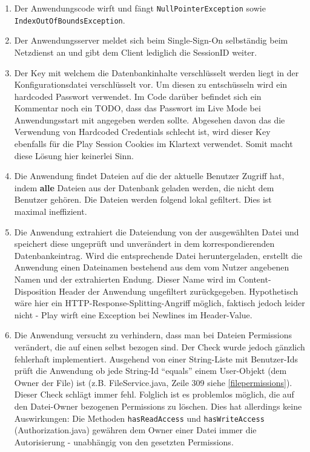 \documentclass[12pt,DIV14,BCOR10mm,a4paper,parskip=half-,headsepline,headinclude,english,ngerman,bibliography=totocnumbered]{scrreprt}
\begin{document}
\begin{enumerate}
  \item Der Anwendungscode wirft und fängt \texttt{NullPointerException} sowie  \newline \texttt{IndexOutOfBoundsException}.
  \item Der Anwendungsserver meldet sich beim Single-Sign-On selbständig beim Netzdienst an und gibt dem Client lediglich die SessionID weiter.
  \item Der Key mit welchem die Datenbankinhalte verschlüsselt werden liegt in der Konfigurationsdatei verschlüsselt vor. Um diesen zu entschüsseln wird ein hardcoded Passwort verwendet. Im Code darüber befindet sich ein Kommentar noch ein TODO, dass das Passwort im Live Mode bei Anwendungsstart mit angegeben werden sollte. Abgesehen davon das die Verwendung von Hardcoded Credentials schlecht ist, wird dieser Key ebenfalls für die Play Session Cookies im Klartext verwendet. Somit macht diese Lösung hier keinerlei Sinn.
  \item Die Anwendung findet Dateien auf die der aktuelle Benutzer Zugriff hat, indem \textbf{alle} Dateien aus der Datenbank geladen werden, die nicht dem Benutzer gehören. Die Dateien werden folgend lokal gefiltert. Dies ist maximal ineffizient.
  \item Die Anwendung extrahiert die Dateiendung von der ausgewählten Datei und speichert diese ungeprüft und unverändert in dem korrespondierenden Datenbankeintrag. Wird die entsprechende Datei heruntergeladen, erstellt die Anwendung einen Dateinamen bestehend aus dem vom Nutzer angebenen Namen und der extrahierten Endung. Dieser Name wird im Content-Disposition Header der Anwendung ungefiltert zurückgegeben. Hypothetisch wäre hier ein HTTP-Response-Splitting-Angriff möglich, faktisch jedoch leider nicht - Play wirft eine Exception bei Newlines im Header-Value.
  \item Die Anwendung versucht zu verhindern, dass man bei Dateien Permissions verändert, die auf einen selbst bezogen sind. Der Check wurde jedoch gänzlich fehlerhaft implementiert. Ausgehend von einer String-Liste mit Benutzer-Ids prüft die Anwendung ob jede String-Id \enquote{equals} einem User-Objekt (dem Owner der File) ist (z.B. FileService.java, Zeile 309 siehe \ref{filepermissions}). Dieser Check schlägt immer fehl. Folglich ist es problemlos möglich, die auf den Datei-Owner bezogenen Permissions zu löschen. Dies hat allerdings keine Auswirkungen: Die Methoden \texttt{hasReadAccess} und \texttt{hasWriteAccess} (Authorization.java) gewähren dem Owner einer Datei immer die Autorisierung - unabhängig von den gesetzten Permissions.

\end{enumerate}
\end{document}
